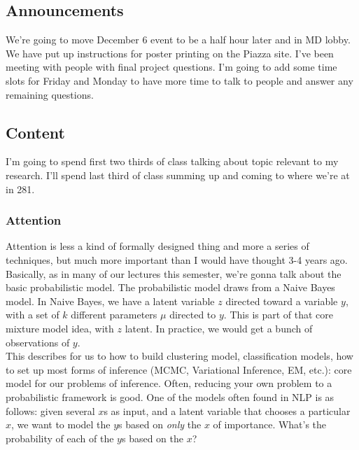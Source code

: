 \documentclass{article}
\begin{document}

\subsection{Announcements}

We're going to move December 6 event to be a half hour later and in MD lobby. We have put up instructions for poster printing on the Piazza site. I've been meeting with people with final project questions. I'm going to add some time slots for Friday and Monday to have more time to talk to people and answer any remaining questions.

\subsection{Content}

I'm going to spend first two thirds of class talking about topic relevant to my research. I'll spend last third of class summing up and coming to where we're at in 281.

\subsubsection{Attention}

Attention is less a kind of formally designed thing and more a series of techniques, but much more important than I would have thought 3-4 years ago. Basically, as in many of our lectures this semester, we're gonna talk about the basic probabilistic model. The probabilistic model draws from a Naive Bayes model. In Naive Bayes, we have a latent variable $z$ directed toward a variable $y$, with a set of $k$ different parameters $\mu$ directed to $y$. This is part of that core mixture model idea, with $z$ latent. In practice, we would get a bunch of observations of $y$.\\

This describes for us to how to build clustering model, classification models, how to set up most forms of inference (MCMC, Variational Inference, EM, etc.): core model for our problems of inference. Often, reducing your own problem to a probabilistic framework is good. One of the models often found in NLP is as follows: given several $x$s as input, and a latent variable that chooses a particular $x$, we want to model the $y$s based on \textit{only} the $x$ of importance. What's the probability of each of the $y$s based on the $x$?\\
\end{document}
